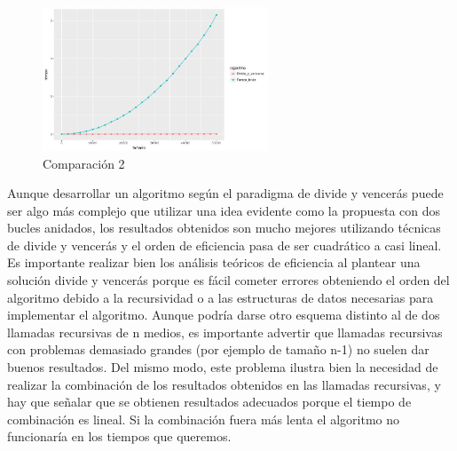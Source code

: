 \documentclass[a4paper, 11pt]{article}
\begin{document}
\begin{figure}[!htp]
	\includegraphics[width=0.6\textwidth]{3.png}
	\caption{Comparación 2	\label{comp1}}
\end{figure}

Aunque desarrollar un algoritmo según el paradigma de divide y vencerás puede ser algo más complejo que utilizar una idea evidente como la propuesta con dos bucles anidados, los resultados obtenidos son mucho mejores utilizando técnicas de divide y vencerás y el orden de eficiencia pasa de ser cuadrático a casi lineal. Es importante realizar bien los análisis teóricos de eficiencia al plantear una solución divide y vencerás porque es fácil cometer errores obteniendo el orden del algoritmo debido a la recursividad o a las estructuras de datos necesarias para implementar el algoritmo. Aunque podría darse otro esquema distinto al de dos llamadas recursivas de n medios, es importante advertir que llamadas recursivas con problemas demasiado grandes (por ejemplo de tamaño n-1) no suelen dar buenos resultados. Del mismo modo, este problema ilustra bien la necesidad de realizar la combinación de los resultados obtenidos en las llamadas recursivas, y hay que señalar que se obtienen resultados adecuados porque el tiempo de combinación es lineal. Si la combinación fuera más lenta el algoritmo no funcionaría en los tiempos que queremos.
\end{document}

